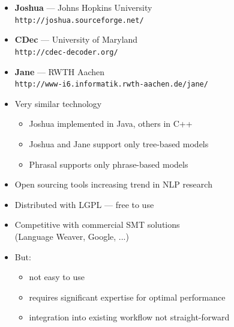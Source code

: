 \documentclass[landscape]{uedslides2C}
\begin{document}

\vspace{5mm}
\begin{itemize} \itemsep -1mm
\item {\bf Joshua} --- Johns Hopkins University\\
{\small \tt http://joshua.sourceforge.net/}
\item {\bf CDec} --- University of Maryland\\
{\small \tt http://cdec-decoder.org/}
\item {\bf Jane} --- RWTH Aachen\\
{\small \tt http://www-i6.informatik.rwth-aachen.de/jane/}
\vspace{2mm}
\item Very similar technology \vspace{-2mm}
\begin{itemize}
\item Joshua implemented in Java, others in C++
\item Joshua and Jane support only tree-based models
\item Phrasal supports only phrase-based models
\end{itemize}
\item Open sourcing tools increasing trend in NLP research
\end{itemize}


\vspace{20mm}
\begin{itemize}
\item Distributed with LGPL --- free to use
\item Competitive with commercial SMT solutions\\ (Language Weaver, Google, ...)
\item But:
\begin{itemize}
\item not easy to use
\item requires significant expertise for optimal performance
\item integration into existing workflow not straight-forward
\end{itemize}
\end{itemize}

\end{document}

